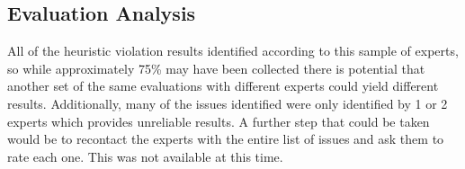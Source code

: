 \documentclass[a4 paper, 12pt]{article}
\begin{document}

	
 		


    \subsection{Evaluation Analysis}

     All of the heuristic violation results identified according to this sample of experts, so while approximately 75\% may have been collected there is potential that another set of the same evaluations with different experts could yield different results. Additionally, many of the issues identified were only identified by 1 or 2 experts which provides unreliable results. A further step that could be taken would be to recontact the experts with the entire list of issues and ask them to rate each one. This was not available at this time. 
\end{document}
